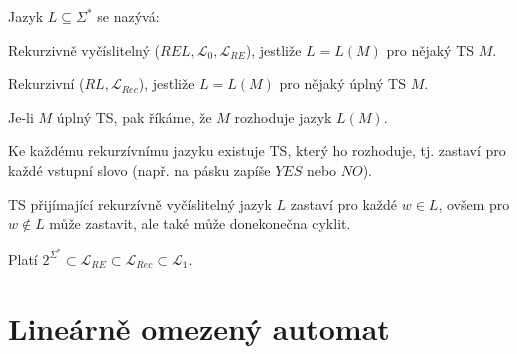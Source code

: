 \begin{compactitem}
    \item Jazyk $L \subseteq \Sigma^*$ se nazývá: \begin{compactitem}
        \item Rekurzivně vyčíslitelný ($REL, \mathcal{L}_0, \mathcal{L}_{RE}$), jestliže $L = L(M)$ pro nějaký TS $M$.

        \item Rekurzivní ($RL, \mathcal{L}_{Rec}$), jestliže $L = L(M)$ pro nějaký úplný TS $M$.
    \end{compactitem}

    \item Je-li $M$ úplný TS, pak říkáme, že $M$ rozhoduje jazyk $L(M)$.

    \item Ke každému rekurzívnímu jazyku existuje TS, který ho rozhoduje, tj. zastaví pro každé vstupní slovo (např. na pásku zapíše $YES$ nebo $NO$).

    \item TS přijímající rekurzívně vyčíslitelný jazyk $L$ zastaví pro každé $w \in L$, ovšem pro $w \not\in L$ může zastavit, ale také může donekonečna cyklit.

    \item Platí $2^{\Sigma^*} \subset \mathcal{L}_{RE} \subset \mathcal{L}_{Rec} \subset \mathcal{L}_1$.
\end{compactitem}


\section{Lineárně omezený automat}

